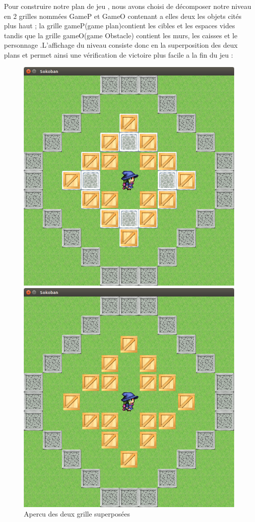 \documentclass{article}
\begin{document}
				Pour construire notre plan de jeu , nous avons choisi de décomposer notre niveau en 2 grilles nommées GameP et GameO contenant a elles deux les objets cités plus haut ; la grille gameP(game plan)contient les cibles et les espaces vides tandis que la grille gameO(game Obstacle) contient les murs, les caisses et le personnage .L'affichage du niveau consiste donc en la superposition des deux plans et permet ainsi une vérification de victoire plus facile a la fin du jeu : 
				\begin{figure}
				
				\begin{center}
					\includegraphics[scale=0.25]{../Screenshots/05.png}
						\caption{Apercu des deux grille superposées}
					\includegraphics[scale=0.25]{../Screenshots/06.png}

\end{center}
\end{figure}
\end{document}
